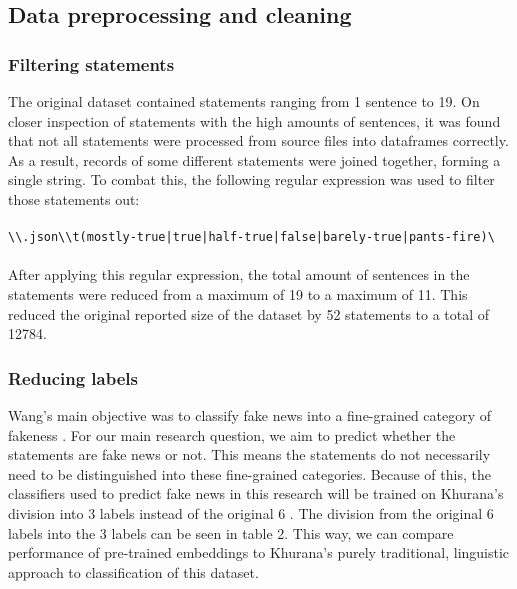 \subsection{Data preprocessing and cleaning}
\subsubsection{Filtering statements}
The original dataset contained statements ranging from 1 sentence to 19. 
On closer inspection of statements with the high amounts of sentences, it was found that not all statements were processed from source files into dataframes correctly.
As a result, records of some different statements were joined together, forming a single string.
To combat this, the following regular expression was used to filter those statements out:\\
\\
\verb/\\.json\\t(mostly-true|true|half-true|false|barely-true|pants-fire)\/\\
\\
After applying this regular expression, the total amount of sentences in the statements were reduced from a maximum of 19 to a maximum of 11. 
This reduced the original reported size of the dataset by 52 statements to a total of 12784. 

\subsubsection{Reducing labels}

Wang's main objective was to classify fake news into a fine-grained category of fakeness \cite{wang2018}.
For our main research question, we aim to predict whether the statements are fake news or not. 
This means the statements do not necessarily need to be distinguished into these fine-grained categories.
Because of this, the classifiers used to predict fake news in this research will be trained on Khurana's division into 3 labels instead of the original 6 \cite{khurana2017}.
The division from the original 6 labels into the 3 labels can be seen in table 2. 
This way, we can compare performance of pre-trained embeddings to Khurana's purely traditional, linguistic approach to classification of this dataset.

